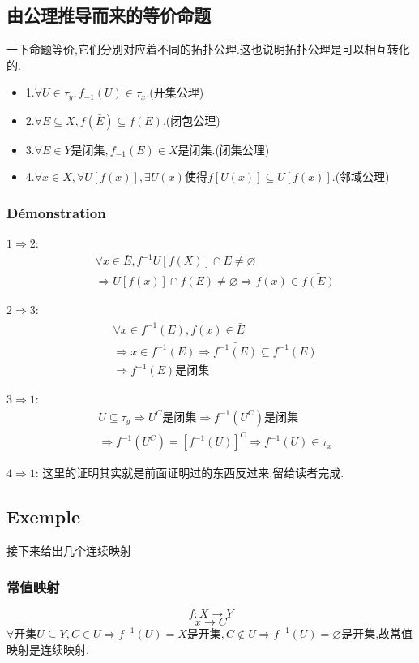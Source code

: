 \documentclass[12pt, a4paper, oneside]{ctexbook}
\begin{document}
  \subsection{由公理推导而来的等价命题}
  一下命题等价,它们分别对应着不同的拓扑公理.这也说明拓扑公理是可以相互转化的.
  \begin{itemize}
    \item 1.$\forall U\in\tau_y,f_{-1}(U)\in\tau_x$.(开集公理)
    \item 2.$\forall E\subseteq X,f(\bar{E})\subseteq \bar{f(E)}$.(闭包公理)
    \item 3.$\forall E\in Y\text{是闭集},f_{-1}(E)\in X\text{是闭集}$.(闭集公理)
    \item 4.$\forall x\in X, \forall U[f(x)], \exists U(x)\text{使得}f[U(x)]\subseteq U[f(x)]$.(邻域公理)
  \end{itemize}
  \subsubsection{Démonstration}
  $1\Rightarrow 2$:
  $$
  \begin{aligned}&
    \forall x\in \bar{E},f^{-1}U[f(X)]\cap E\neq\varnothing\\&
    \Rightarrow U[f(x)]\cap f(E)\neq\varnothing\Rightarrow f(x)\in \bar{f(E)}
    \end{aligned}
  $$


  $2\Rightarrow 3$:
  $$
  \begin{aligned}&
    \forall x\in \bar{f^{-1}(E)},f(x)\in \bar{E}\\&
    \Rightarrow x\in f^{-1}(E)\Rightarrow\bar{f^{-1}(E)}\subseteq f^{-1}(E)\\&
    \Rightarrow f^{-1}(E)\text{是闭集}
    \end{aligned}
  $$


  $3\Rightarrow 1$:
  $$
  \begin{aligned}&
    U\subseteq \tau_y\Rightarrow U^C\text{是闭集}\Rightarrow f^{-1}(U^C)\text{是闭集}\\&
    \Rightarrow f^{-1}(U^C)=[f^{-1}(U)]^C\Rightarrow f^{-1}(U)\in\tau_x
    \end{aligned}
  $$


  $4\Rightarrow 1$:
  这里的证明其实就是前面证明过的东西反过来,留给读者完成.
  \subsection{Exemple}
  接下来给出几个连续映射
  \subsubsection{常值映射 }
  $$
    f:X\rightarrow  Y
  $$
  $$
    x\rightarrow C
  $$
  $\forall \text{开集}U\subseteq Y,C\in U\Rightarrow f^{-1}(U)=X \text{是开集}, 
  C\notin U\Rightarrow f^{-1}(U)=\varnothing \text{是开集}$,故常值映射是连续映射.
\end{document}
